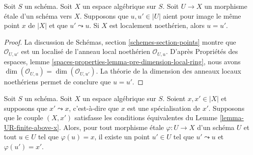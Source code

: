 \begin{lemma}
\label{lemma-no-specializations-map-to-same-point-Noetherian}
Soit $S$ un schéma. Soit $X$ un espace algébrique sur $S$.
Soit $U \to X$ un morphisme étale d'un schéma vers $X$.
Supposons que $u, u' \in |U|$ aient pour image le même point $x$ de $|X|$ et
que $u' \leadsto u$. Si $X$ est localement noethérien, alors $u = u'$.
\end{lemma}

\begin{proof}
La discussion de Schémas, section \ref{schemes-section-points}
montre que $\mathcal{O}_{U, u'}$ est un localisé de
l'anneau local noethérien $\mathcal{O}_{U, u}$.
D'après Propriétés des espaces, lemme
\ref{spaces-properties-lemma-pre-dimension-local-ring},
nous avons $\dim(\mathcal{O}_{U, u}) = \dim(\mathcal{O}_{U, u'})$.
La théorie de la dimension des anneaux locaux noethériens permet de conclure
que $u = u'$.
\end{proof}

\begin{lemma}
\label{lemma-specialization}
Soit $S$ un schéma.
Soit $X$ un espace algébrique sur $S$.
Soient $x, x' \in |X|$ et supposons que $x' \leadsto x$, c'est-à-dire que $x$
est une spécialisation de $x'$.
Supposons que le couple $(X, x')$ satisfasse les conditions équivalentes
du Lemme \ref{lemma-UR-finite-above-x}.
Alors, pour tout morphisme étale $\varphi : U \to X$ d'un schéma $U$ et tout
$u \in U$ tel que $\varphi(u) = x$, il existe un point $u'\in U$ tel que
$u' \leadsto u$ et $\varphi(u') = x'$.
\end{lemma}

